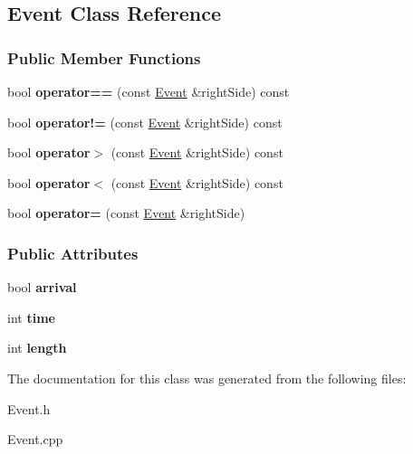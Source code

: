 \hypertarget{class_event}{}\subsection{Event Class Reference}
\label{class_event}
\subsubsection*{Public Member Functions}
\begin{DoxyCompactItemize}
\item 
bool {\bfseries operator==} (const \hyperlink{class_event}{Event} \&right\+Side) const \hypertarget{class_event_aeeee52bac39d185809bfc342a25be2c0}{}\label{class_event_aeeee52bac39d185809bfc342a25be2c0}

\item 
bool {\bfseries operator!=} (const \hyperlink{class_event}{Event} \&right\+Side) const \hypertarget{class_event_adfc8aa073d2ca536ac2ba3d8a5c15038}{}\label{class_event_adfc8aa073d2ca536ac2ba3d8a5c15038}

\item 
bool {\bfseries operator$>$} (const \hyperlink{class_event}{Event} \&right\+Side) const \hypertarget{class_event_af1b0cac6dc643b7fdeaa13f6fb4ccf31}{}\label{class_event_af1b0cac6dc643b7fdeaa13f6fb4ccf31}

\item 
bool {\bfseries operator$<$} (const \hyperlink{class_event}{Event} \&right\+Side) const \hypertarget{class_event_ab79729abd53ca25f0424d48600ce9ee6}{}\label{class_event_ab79729abd53ca25f0424d48600ce9ee6}

\item 
bool {\bfseries operator=} (const \hyperlink{class_event}{Event} \&right\+Side)\hypertarget{class_event_a56ba06376a5dd7890c80a23b33fc2474}{}\label{class_event_a56ba06376a5dd7890c80a23b33fc2474}

\end{DoxyCompactItemize}
\subsubsection*{Public Attributes}
\begin{DoxyCompactItemize}
\item 
bool {\bfseries arrival}\hypertarget{class_event_ae018eaef21b64be859ac1f87d5cf8e40}{}\label{class_event_ae018eaef21b64be859ac1f87d5cf8e40}

\item 
int {\bfseries time}\hypertarget{class_event_ad4c0fbb00c3fd993405df98bafcd52c5}{}\label{class_event_ad4c0fbb00c3fd993405df98bafcd52c5}

\item 
int {\bfseries length}\hypertarget{class_event_a1d58d4227e70762d73683ab5eac7e17a}{}\label{class_event_a1d58d4227e70762d73683ab5eac7e17a}

\end{DoxyCompactItemize}


The documentation for this class was generated from the following files\+:\begin{DoxyCompactItemize}
\item 
Event.\+h\item 
Event.\+cpp\end{DoxyCompactItemize}
